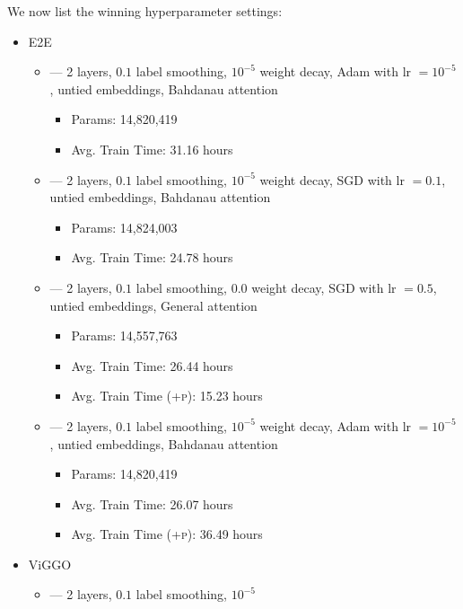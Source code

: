We now list the winning hyperparameter settings:

\begin{itemize}
    \item E2E
\begin{itemize}
    \item {} --- 2 layers, $0.1$ label smoothing, $10^{-5}$
        weight decay, Adam with lr $=10^{-5}$, untied embeddings, Bahdanau attention
        \begin{itemize}
            \item Params: 14,820,419
            \item Avg. Train Time: 31.16 hours
        \end{itemize}
    \item {} --- 2 layers, $0.1$ label smoothing, $10^{-5}$
        weight decay, SGD with lr $=0.1$, untied embeddings, Bahdanau attention
        \begin{itemize}
            \item Params: 14,824,003
            \item Avg. Train Time: 24.78 hours
        \end{itemize}
    \item {} --- 2 layers, $0.1$ label smoothing, $0.0$
        weight decay, SGD with lr $=0.5$, untied embeddings, General attention
        \begin{itemize}
            \item Params: 14,557,763
            \item Avg. Train Time: 26.44 hours
            \item Avg. Train Time (\textsc{+p}): 15.23 hours
        \end{itemize}
    \item {} --- 2 layers, $0.1$ label smoothing, $10^{-5}$
        weight decay, Adam with lr $=10^{-5}$, untied embeddings, Bahdanau attention
        \begin{itemize}
            \item Params: 14,820,419 
            \item Avg. Train Time: 26.07 hours 
            \item Avg. Train Time (\textsc{+p}): 36.49 hours 
        \end{itemize}
\end{itemize}
\item ViGGO
\begin{itemize}
    \item {} --- 2 layers, $0.1$ label smoothing, $10^{-5}$

\end{itemize}
\end{itemize}
